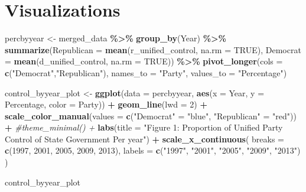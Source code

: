 \documentclass[
]{article}
\newenvironment{Shaded}{\begin{snugshade}}{\end{snugshade}}
\newcommand{\AttributeTok}[1]{\textcolor[rgb]{0.13,0.29,0.53}{#1}}
\newcommand{\CommentTok}[1]{\textcolor[rgb]{0.56,0.35,0.01}{\textit{#1}}}
\newcommand{\ConstantTok}[1]{\textcolor[rgb]{0.56,0.35,0.01}{#1}}
\newcommand{\DecValTok}[1]{\textcolor[rgb]{0.00,0.00,0.81}{#1}}
\newcommand{\FunctionTok}[1]{\textcolor[rgb]{0.13,0.29,0.53}{\textbf{#1}}}
\newcommand{\NormalTok}[1]{#1}
\newcommand{\OtherTok}[1]{\textcolor[rgb]{0.56,0.35,0.01}{#1}}
\newcommand{\SpecialCharTok}[1]{\textcolor[rgb]{0.81,0.36,0.00}{\textbf{#1}}}
\newcommand{\StringTok}[1]{\textcolor[rgb]{0.31,0.60,0.02}{#1}}
\begin{document}
\hypertarget{visualizations}{%
\section{Visualizations}\label{visualizations}}

\begin{Shaded}
\begin{Highlighting}[]
\NormalTok{percbyyear }\OtherTok{\textless{}{-}}\NormalTok{ merged\_data }\SpecialCharTok{\%\textgreater{}\%}
  \FunctionTok{group\_by}\NormalTok{(Year) }\SpecialCharTok{\%\textgreater{}\%}
  \FunctionTok{summarize}\NormalTok{(}\AttributeTok{Republican =} \FunctionTok{mean}\NormalTok{(r\_unified\_control, }\AttributeTok{na.rm =} \ConstantTok{TRUE}\NormalTok{),}
            \AttributeTok{Democrat =} \FunctionTok{mean}\NormalTok{(d\_unified\_control, }\AttributeTok{na.rm =} \ConstantTok{TRUE}\NormalTok{)) }\SpecialCharTok{\%\textgreater{}\%}
  \FunctionTok{pivot\_longer}\NormalTok{(}\AttributeTok{cols =} \FunctionTok{c}\NormalTok{(}\StringTok{"Democrat"}\NormalTok{,}\StringTok{"Republican"}\NormalTok{),}
               \AttributeTok{names\_to =} \StringTok{"Party"}\NormalTok{,}
               \AttributeTok{values\_to =} \StringTok{"Percentage"}\NormalTok{)}

\NormalTok{control\_byyear\_plot }\OtherTok{\textless{}{-}} \FunctionTok{ggplot}\NormalTok{(}\AttributeTok{data =}\NormalTok{ percbyyear, }\FunctionTok{aes}\NormalTok{(}\AttributeTok{x =}\NormalTok{ Year, }
                                                      \AttributeTok{y =}\NormalTok{ Percentage,}
                                                      \AttributeTok{color =}\NormalTok{ Party)) }\SpecialCharTok{+} 
  \FunctionTok{geom\_line}\NormalTok{(}\AttributeTok{lwd =} \DecValTok{2}\NormalTok{) }\SpecialCharTok{+} 
  \FunctionTok{scale\_color\_manual}\NormalTok{(}\AttributeTok{values =} \FunctionTok{c}\NormalTok{(}\StringTok{"Democrat"} \OtherTok{=} \StringTok{"blue"}\NormalTok{, }\StringTok{"Republican"} \OtherTok{=} \StringTok{"red"}\NormalTok{)) }\SpecialCharTok{+} 
  \CommentTok{\#theme\_minimal() + }
  \FunctionTok{labs}\NormalTok{(}\AttributeTok{title =} \StringTok{"Figure 1: Proportion of Unified Party Control of State Government Per year"}\NormalTok{) }\SpecialCharTok{+} 
  \FunctionTok{scale\_x\_continuous}\NormalTok{(}
    \AttributeTok{breaks =} \FunctionTok{c}\NormalTok{(}\DecValTok{1997}\NormalTok{, }\DecValTok{2001}\NormalTok{, }\DecValTok{2005}\NormalTok{, }\DecValTok{2009}\NormalTok{, }\DecValTok{2013}\NormalTok{), }
    \AttributeTok{labels =} \FunctionTok{c}\NormalTok{(}\StringTok{"1997"}\NormalTok{, }\StringTok{"2001"}\NormalTok{, }\StringTok{"2005"}\NormalTok{, }\StringTok{"2009"}\NormalTok{, }\StringTok{"2013"}\NormalTok{)}
\NormalTok{  )}

\NormalTok{control\_byyear\_plot}
\end{Highlighting}
\end{Shaded}
\end{document}
